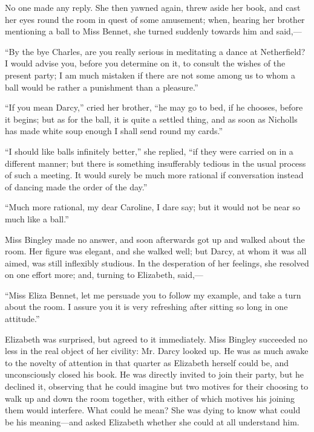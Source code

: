\documentclass[10pt]{book}
\begin{document}
   No one made any reply. She then yawned again, threw aside her book, and
cast her eyes round the room in quest of some amusement; when, hearing
her brother mentioning a ball to Miss Bennet, she turned suddenly
towards him and said,—
  

   “By the bye Charles, are you really serious in meditating a dance at
Netherfield? I would advise you, before you determine on it, to consult
the wishes of the present party; I am much mistaken if there are not
some among us to whom a ball would be rather a punishment than a
pleasure.”
  

   “If you mean Darcy,” cried her brother, “he may go to bed, if he
chooses, before it begins; but as for the ball, it is quite a settled
thing, and as soon as Nicholls has made white soup enough I shall send
round my cards.”
  

   “I should like balls infinitely better,” she replied, “if they were
carried on in a different manner; but there is something insufferably
tedious in the usual process of such a meeting. It would surely be much
more rational if conversation instead of dancing made the order of the
day.”
  

   “Much more rational, my dear Caroline, I dare say; but it would not be
near so much like a ball.”
  

   Miss Bingley made no answer, and soon afterwards got up and walked about
the room. Her figure was elegant, and she walked well; but Darcy, at
whom it was
   all aimed, was still inflexibly studious. In the
desperation of her feelings, she resolved on one effort more; and,
turning to Elizabeth, said,—
  

   “Miss Eliza Bennet, let me persuade you to follow my example, and take a
turn about the room. I assure you it is very refreshing after sitting so
long in one attitude.”
  

   Elizabeth was surprised, but agreed to it immediately. Miss Bingley
succeeded no less in the real object of her civility: Mr. Darcy looked
up. He was as much awake to the novelty of attention in that quarter as
Elizabeth herself could be, and unconsciously closed his book. He was
directly invited to join their party, but he declined it, observing that
he could imagine but two motives for their choosing to walk up and down
the room together, with either of which motives his joining them would
interfere. What could he mean? She was dying to know what could be his
meaning—and asked Elizabeth whether she could at all understand him.
  
\end{document}
